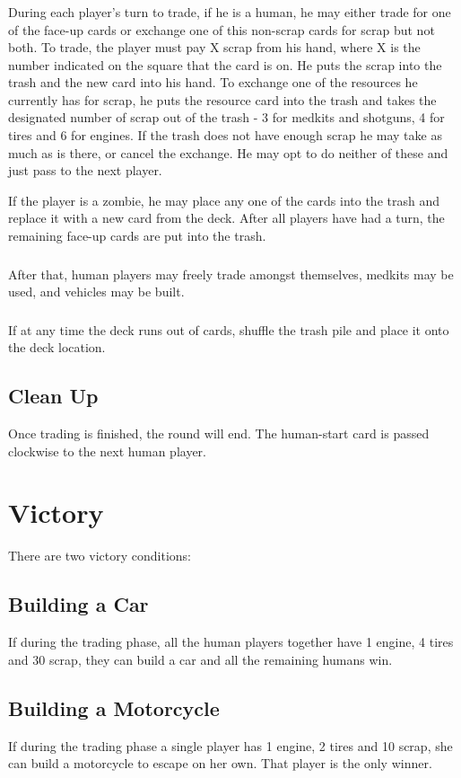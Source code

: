 \documentclass[12pt]{article} %
\begin{document}
\subsubsection{}
During each player's turn to trade, if he is a human, he may either trade for one of the face-up cards or exchange one of this non-scrap cards for scrap but not both.  To trade, the player must pay X scrap from his hand, where X is the number indicated on the square that the card is on.  He puts the scrap into the trash and the new card into his hand. To exchange one of the resources he currently has for scrap, he puts the resource card into the trash and takes the designated number of scrap out of the trash - 3 for medkits and shotguns, 4 for tires and 6 for engines.  If the trash does not have enough scrap he may take as much as is there, or cancel the exchange.  He may opt to do neither of these and just pass to the next player.  \newline

If the player is a zombie, he may place any one of the cards into the trash and replace it with a new card from the deck.  After all players have had a turn, the remaining face-up cards are put into the trash.

\subsubsection{}
After that, human players may freely trade amongst themselves, medkits may be used, and vehicles may be built.

\subsubsection{}
If at any time the deck runs out of cards, shuffle the trash pile and place it onto the deck location.

\subsection{Clean Up}
Once trading is finished, the round will end.  The human-start card is passed clockwise to the next human player.

\section{Victory}
There are two victory conditions:

\subsection{Building a Car}
If during the trading phase, all the human players together have 1 engine, 4 tires and 30 scrap, they can build a car and all the remaining humans win.

\subsection{Building a Motorcycle}
If during the trading phase a single player has 1 engine, 2 tires and 10 scrap, she can build a motorcycle to escape on her own.  That player is the only winner.
\end{document}
